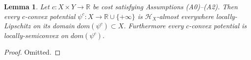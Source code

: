 \documentclass[12pt]{amsart}
\newtheorem{lem}{Lemma}
\theoremstyle{definition}
\theoremstyle{remark}
\newcommand{\bR}{\mathbb{R}}
\newcommand{\del}{\partial}
\begin{document}
\begin{lem}\label{lip2}
Let $c: X\times Y \to \bR$ be cost satisfying Assumptions (A0)--(A2). Then every $c$-convex potential $\psi^c: X\to \bR \cup \{+\infty\}$ is $\mathscr{H}_X$-almost everywhere locally-Lipschitz on its domain $dom(\psi^c) \subset X$. Furthermore every $c$-convex potential is locally-semiconvex on $dom(\psi^c)$. 
\end{lem}
\begin{proof}
Omitted.
\end{proof}









\end{document}
